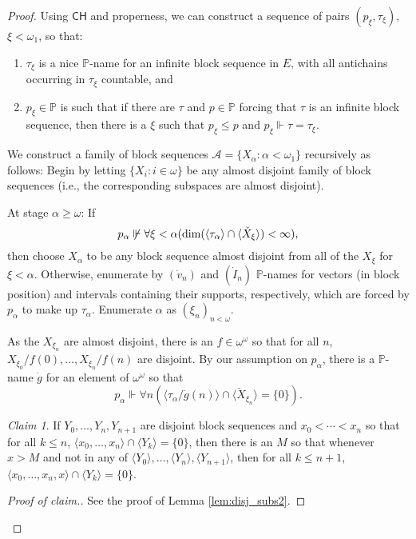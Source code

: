 \documentclass[11pt]{amsart}
\newcommand{\forces}{\mathrel{\Vdash}}
\renewcommand{\P}{\mathbb{P}}
\newcommand{\LA}{\mathcal{A}}
\theoremstyle{definition}
\theoremstyle{remark}
\newtheorem*{claim}{Claim}
\newcommand{\CH}{\mathsf{CH}}
\renewcommand{\P}{\mathbb{P}}
\renewcommand{\1}{\mathbf{1}}
\begin{document}
\begin{proof}
	Using $\CH$ and properness, we can construct a sequence of pairs $(p_\xi,\tau_\xi)$, $\xi<\omega_1$, so that:
	\begin{enumerate}[label=\textup{(\roman*)}]
		\item $\tau_{\xi}$ is a nice $\P$-name for an infinite block sequence in $E$, with all antichains occurring in $\tau_\xi$ countable, and
		\item $p_\xi\in\P$ is such that if there are $\tau$ and $p\in\P$ forcing that $\tau$ is an infinite block sequence, then there is a $\xi$ such that $p_\xi\leq p$ and $p_\xi\forces\tau =\tau_\xi$.
	\end{enumerate}
	
	We construct a family of block sequences $\LA=\{X_\alpha:\alpha<\omega_1\}$ recursively as follows: Begin by letting $\{X_i:i\in\omega\}$ be any almost disjoint family of block sequences (i.e., the corresponding subspaces are almost disjoint).
	
	At stage $\alpha\geq\omega$: If
	\[
		p_\alpha\not\forces\forall\xi<\alpha(\dim(\langle\tau_\alpha\rangle\cap\langle\check{X}_\xi\rangle)<\infty),
	\]
	then choose $X_\alpha$ to be any block sequence almost disjoint from all of the $X_\xi$ for $\xi<\alpha$. Otherwise, enumerate by $(\dot{v}_n)$ and $(\dot{I}_n)$ $\P$-names for vectors (in block position) and intervals containing their supports, respectively, which are forced by $p_\alpha$ to make up $\tau_\alpha$. Enumerate $\alpha$ as $(\xi_n)_{n<\omega}$.
	
	As the $X_{\xi_n}$ are almost disjoint, there is an $f\in\omega^\omega$ so that for all $n$, $X_{\xi_0}/f(0),\ldots,X_{\xi_n}/f(n)$ are disjoint. By our assumption on $p_\alpha$, there is a $\P$-name $\dot{g}$ for an element of $\omega^\omega$ so that
	\[
		p_\alpha\forces\forall n(\langle\tau_\alpha/\dot{g}(n)\rangle\cap\langle \check{X}_{\xi_n}\rangle=\{0\}).
	\]
	
	\begin{claim}
		If $Y_0,\ldots,Y_n,Y_{n+1}$ are disjoint block sequences and $x_0<\cdots<x_n$ so that for all $k\leq n$, $\langle x_0,\ldots,x_n\rangle\cap\langle Y_k\rangle=\{0\}$, then there is an $M$ so that whenever $x>M$ and not in any of $\langle Y_0\rangle,\ldots,\langle Y_n\rangle,\langle Y_{n+1}\rangle$, then for all $k\leq n+1$, $\langle x_0,\ldots,x_n,x\rangle\cap\langle Y_k\rangle=\{0\}$.
	\end{claim}
	
	\begin{proof}[Proof of claim.]
		See the proof of Lemma \ref{lem:disj_subs2}.
	\end{proof}
	

\end{proof}
\end{document}
